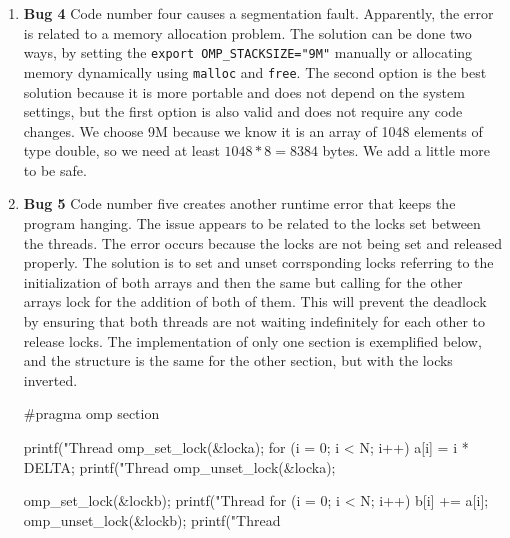 \documentclass[unicode,11pt,a4paper,oneside,numbers=endperiod,openany]{scrartcl}
\begin{document}
\begin{enumerate}
  \item \textbf{Bug 4}
  Code number four causes a segmentation fault. Apparently, the error is related
 to a
  memory allocation problem. The solution can be done two ways, by setting the
  \texttt{export OMP\_STACKSIZE="9M"} manually or allocating memory dynamically
  using \texttt{malloc} and \texttt{free}. The second option is the best
  solution because it is more portable and does not depend on the system
  settings, but the first option is also valid and does not require any code
  changes. We choose 9M because we know it is an array of 1048 elements of type
  double, so we need at least $1048*8=8384$ bytes. We add a little more to be
  safe.

  \item \textbf{Bug 5}
  Code number five creates another runtime error that keeps the program hanging.
  The issue appears to be related to the locks set between the threads. The
  error occurs because the locks are not being set and released properly. The
  solution is to set and unset corrsponding locks referring to the
  initialization of both arrays and then the same but calling for the other
  arrays lock for the addition of both of them. This will prevent the deadlock
  by ensuring that both threads are not waiting indefinitely for each other to
  release locks.
  The implementation of only one section is exemplified below, and the structure
  is the same for the other section, but with the locks inverted.
  \begin{cppverbatim}
#pragma omp section
  {
    printf("Thread %
    omp_set_lock(&locka);
    for (i = 0; i < N; i++)
      a[i] = i * DELTA;
    printf("Thread %
    omp_unset_lock(&locka);

    omp_set_lock(&lockb);
    printf("Thread %
    for (i = 0; i < N; i++)
      b[i] += a[i];
    omp_unset_lock(&lockb);
    printf("Thread %
  }
  \end{cppverbatim}

\end{enumerate}
\end{document}
